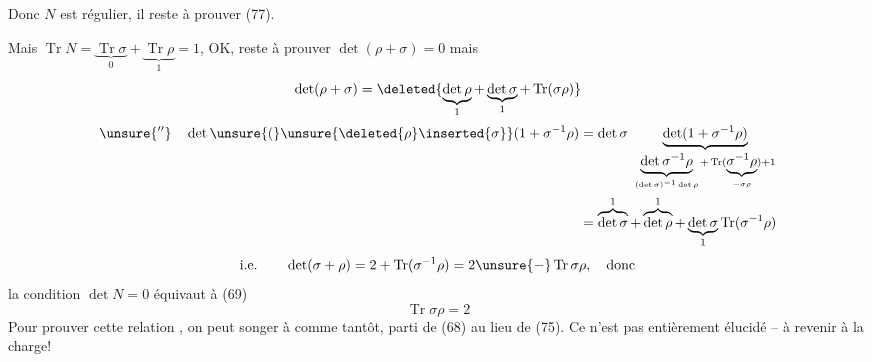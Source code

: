 Donc $N$ est régulier, il reste à prouver (77).

Mais $\operatorname{Tr}N=\underbrace{\operatorname{Tr}\sigma}_{0}+\underbrace{\operatorname{Tr}\rho}_{1}=1$, OK, reste à prouver $\det(\rho+\sigma)=0$ mais
\[
\det(\rho+\sigma)=\deleted{\underbrace{\det\rho}_{1}+\underbrace{\det\sigma}_{1}+\operatorname{Tr}(\sigma\rho)}
\]
\[
\begin{aligned}
\unsure{''}\quad
\det\unsure{(}\unsure{\deleted{\rho}\inserted{\sigma}}(1+\sigma^{-1}\rho)
&=\det\sigma\ \underbrace{\det(1+\sigma^{-1}\rho)}_{\underbrace{\det\sigma^{-1}\rho}_{(\det\sigma)^{-1}\det\rho}+\operatorname{Tr}(\underbrace{\sigma^{-1}\rho}_{-\sigma\rho})+1}\\
&=\overbrace{\det\sigma}^{1}+\overbrace{\det\rho}^{1}+\underbrace{\det\sigma}_{1}\operatorname{Tr}(\sigma^{-1}\rho)
\end{aligned}
\]
\[
\text{i.e.}\qquad\det(\sigma+\rho)=2+\operatorname{Tr}(\sigma^{-1}\rho)=2\unsure{-}\operatorname{Tr}\sigma\rho,\quad\text{donc}
\]
la condition $\det N=0$ équivaut à (69)
\[
\operatorname{Tr}\sigma\rho=2
\]
Pour  prouver cette relation , on peut songer à  comme tantôt,   parti de (68) au lieu de (75). Ce n'est pas entièrement élucidé -- à revenir à la charge!

